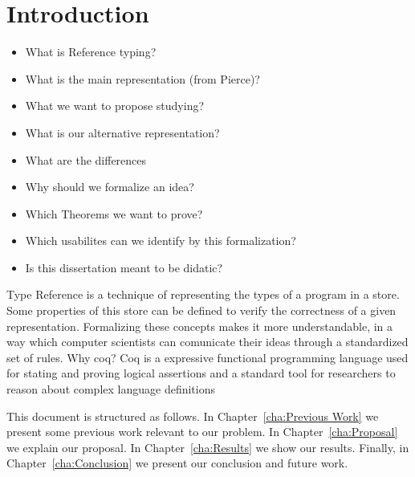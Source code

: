 
\chapter{Introduction}
\begin{itemize}
    \color{red}
    \item What is Reference typing?
    \item What is the main representation (from Pierce)?
    \item What we want to propose studying?
    \item What is our alternative representation?
    \item What are the differences
    \item Why should we formalize an idea?
    \item Which Theorems we want to prove?
    \item Which usabilites can we identify by this formalization?
    \item Is this dissertation meant to be didatic?
\end{itemize}
Type Reference is a technique of representing the types of a program in a store. Some properties of this store can be defined to verify the correctness of a given representation. Formalizing these concepts makes it more understandable, in a way which computer scientists can comunicate their ideas through a standardized set of rules.
Why coq? Coq is a expressive functional programming language used for stating and proving logical assertions and a standard tool for researchers to reason about complex language definitions \cite{Pierce_SF1}



This document is structured as follows. In Chapter~\ref{cha:Previous Work} we present some previous work relevant to our problem. In Chapter~\ref{cha:Proposal} we explain our proposal. In Chapter~\ref{cha:Results} we show our results. Finally, in Chapter~\ref{cha:Conclusion} we present our conclusion and future work.


